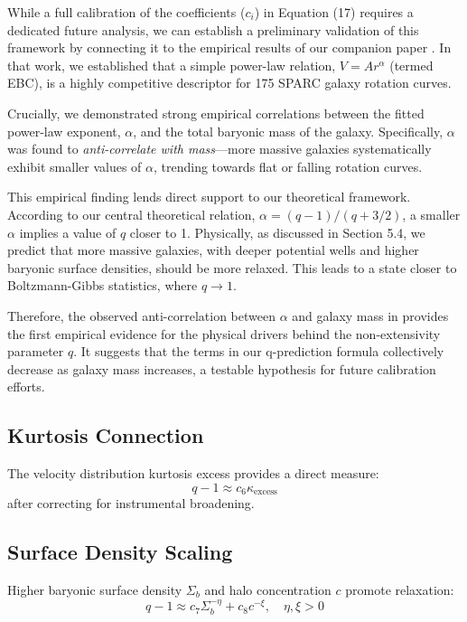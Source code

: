 \documentclass[12pt, a4paper]{article}
\theoremstyle{definition}
\theoremstyle{remark}
\begin{document}
While a full calibration of the coefficients ($c_i$) in Equation (17) requires a dedicated future analysis, we can establish a preliminary validation of this framework by connecting it to the empirical results of our companion paper \cite{Tupay2025a}. In that work, we established that a simple power-law relation, $V = Ar^{\alpha}$ (termed EBC), is a highly competitive descriptor for 175 SPARC galaxy rotation curves.

Crucially, we demonstrated strong empirical correlations between the fitted power-law exponent, $\alpha$, and the total baryonic mass of the galaxy. Specifically, $\alpha$ was found to \emph{anti-correlate with mass}---more massive galaxies systematically exhibit smaller values of $\alpha$, trending towards flat or falling rotation curves.

This empirical finding lends direct support to our theoretical framework. According to our central theoretical relation, $\alpha = (q-1)/(q+3/2)$, a smaller $\alpha$ implies a value of $q$ closer to 1. Physically, as discussed in Section 5.4, we predict that more massive galaxies, with deeper potential wells and higher baryonic surface densities, should be more relaxed. This leads to a state closer to Boltzmann-Gibbs statistics, where $q \rightarrow 1$.

Therefore, the observed anti-correlation between $\alpha$ and galaxy mass in \cite{Tupay2025a} provides the first empirical evidence for the physical drivers behind the non-extensivity parameter $q$. It suggests that the terms in our q-prediction formula collectively decrease as galaxy mass increases, a testable hypothesis for future calibration efforts.

\subsection{Kurtosis Connection}

The velocity distribution kurtosis excess provides a direct measure:
\begin{equation}
q - 1 \approx c_6 \kappa_{\text{excess}}
\end{equation}
after correcting for instrumental broadening.

\subsection{Surface Density Scaling}

Higher baryonic surface density $\Sigma_b$ and halo concentration $c$ promote relaxation:
\begin{equation}
q - 1 \approx c_7 \Sigma_b^{-\eta} + c_8 c^{-\xi}, \quad \eta, \xi > 0
\end{equation}
\end{document}
